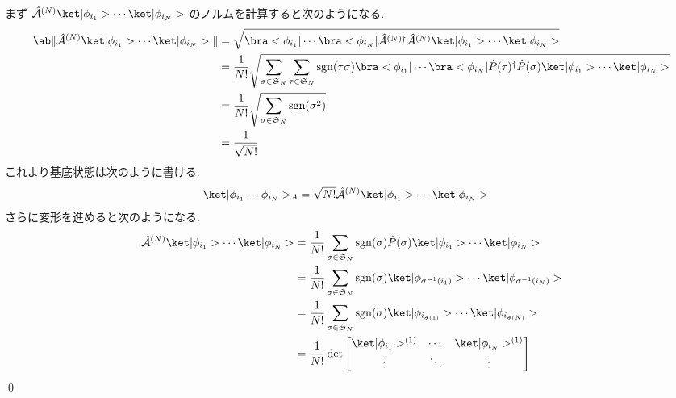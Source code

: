 \documentclass[uplatex,dvipdfmx,a4paper,11pt]{jlreq}
\makeatletter
\DeclareMathOperator{\sgn}{sgn}
\renewcommand{\SS}{\mathfrak{S}}
\newcommand{\A}{\mathcal{A}}
\numberwithin{equation}{section}
\theoremstyle{definition}
\renewenvironment{proof}[1][\proofname]{\par
  \normalfont
  \topsep6\p@\@plus6\p@ \trivlist
  \item[\hskip\labelsep{\bfseries #1}\@addpunct{\bfseries}]\ignorespaces\quad\par
}{%
  \qed\endtrivlist\@endpefalse
}
\renewcommand\proofname{証明}
\makeatother
\begin{document}
\begin{proof}
  まず $\hat{\A}^{(N)}\ket|\phi_{i_1}>\cdots\ket|\phi_{i_N}>$ のノルムを計算すると次のようになる.
  \begin{align}
    \ab\|\hat{\A}^{(N)}\ket|\phi_{i_1}>\cdots\ket|\phi_{i_N}>\| & = \sqrt{\bra<\phi_{i_1}|\cdots\bra<\phi_{i_N}|\hat{\A}^{(N)\dagger}\hat{\A}^{(N)}\ket|\phi_{i_1}>\cdots\ket|\phi_{i_N}>}                                                                      \\
                                                                & = \frac{1}{N!}\sqrt{\sum_{\sigma\in\SS_N}\sum_{\tau\in\SS_N}\sgn(\tau\sigma)\bra<\phi_{i_1}|\cdots\bra<\phi_{i_N}|\hat{P}(\tau)^\dagger\hat{P}(\sigma)\ket|\phi_{i_1}>\cdots\ket|\phi_{i_N}>} \\
                                                                & = \frac{1}{N!}\sqrt{\sum_{\sigma\in\SS_N}\sgn(\sigma^2)}                                                                                                                                      \\
                                                                & = \frac{1}{\sqrt{N!}}
  \end{align}
  これより基底状態は次のように書ける.
  \begin{align}
    \ket|\phi_{i_1}\cdots\phi_{i_N}>_A & = \sqrt{N!}\hat{\A}^{(N)}\ket|\phi_{i_1}>\cdots\ket|\phi_{i_N}>
  \end{align}
  さらに変形を進めると次のようになる.
  \begin{align}
    \hat{\A}^{(N)}\ket|\phi_{i_1}>\cdots\ket|\phi_{i_N}> & = \frac{1}{N!}\sum_{\sigma\in\SS_N}\sgn(\sigma)\hat{P}(\sigma)\ket|\phi_{i_1}>\cdots\ket|\phi_{i_N}>            \\
                                                         & = \frac{1}{N!}\sum_{\sigma\in\SS_N}\sgn(\sigma)\ket|\phi_{\sigma^{-1}(i_1)}>\cdots\ket|\phi_{\sigma^{-1}(i_N)}> \\
                                                         & = \frac{1}{N!}\sum_{\sigma\in\SS_N}\sgn(\sigma)\ket|\phi_{i_{\sigma(1)}}>\cdots\ket|\phi_{i_{\sigma(N)}}>       \\
                                                         & = \frac{1}{N!}\det\begin{bmatrix}
                                                                               \ket|\phi_{i_1}>^{(1)} & \cdots & \ket|\phi_{i_N}>^{(1)} \\
                                                                               \vdots                 & \ddots & \vdots                 \\

\end{bmatrix}
\end{align}
\end{proof}
\end{document}
